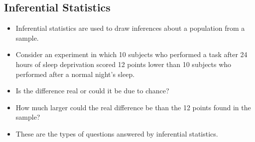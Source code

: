 \documentclass[a4paper,12pt]{article}
\begin{document}

\subsection*{ Inferential Statistics}
\begin{itemize}
	\item Inferential statistics are used to draw inferences about a population from a sample.
	\item Consider an experiment in which 10 subjects who performed a task after 24 hours of sleep
	deprivation scored 12 points lower than 10 subjects who performed after a normal night's sleep.
	\item Is the difference real or could it be due to chance?
	\item How much larger could the real difference be than the 12 points found in the sample?
	\item These are the types of questions answered by inferential statistics.
\end{itemize}
\end{document}

